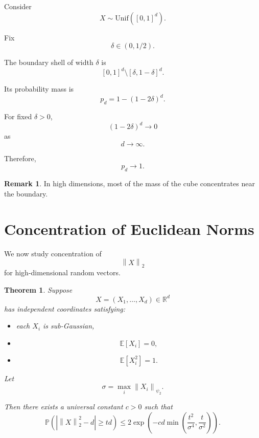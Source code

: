 \documentclass[12pt,oneside]{book}
\numberwithin{equation}{section}
\theoremstyle{definition}
\newtheorem{remark}{Remark}[section]
\theoremstyle{plain}
\newtheorem{theorem}{Theorem}[section]
\theoremstyle{remark}
\newcommand{\R}{\mathbb{R}}
\newcommand{\E}{\mathbb{E}}
\newcommand{\Prob}{\mathbb{P}}
\newcommand{\norm}[1]{\left\lVert #1 \right\rVert}
\begin{document}
Consider
\[
X\sim \mathrm{Unif}([0,1]^d).
\]

Fix
\[
\delta\in(0,1/2).
\]

The boundary shell of width $\delta$ is
\[
[0,1]^d
\setminus
[\delta,1-\delta]^d.
\]

Its probability mass is
\[
p_d
=
1-(1-2\delta)^d.
\]

For fixed $\delta>0$,
\[
(1-2\delta)^d\to0
\]
as
\[
d\to\infty.
\]

Therefore,
\[
p_d\to1.
\]

\begin{remark}
In high dimensions, most of the mass of the cube concentrates near the boundary.
\end{remark}

\section{Concentration of Euclidean Norms}

We now study concentration of
\[
\norm{X}_2
\]
for high-dimensional random vectors.

\begin{theorem}
Suppose
\[
X=(X_1,\dots,X_d)\in\R^d
\]
has independent coordinates satisfying:
\begin{itemize}
\item each $X_i$ is sub-Gaussian,
\item
\[
\E[X_i]=0,
\]
\item
\[
\E[X_i^2]=1.
\]
\end{itemize}

Let
\[
\sigma
=
\max_i \norm{X_i}_{\psi_2}.
\]

Then there exists a universal constant $c>0$ such that
\[
\Prob\left(
\left|
\norm{X}_2^2-d
\right|
\geq td
\right)
\leq
2\exp\left(
-cd\min\left(
\frac{t^2}{\sigma^4},
\frac{t}{\sigma^2}
\right)
\right).
\]
\end{theorem}
\end{document}
